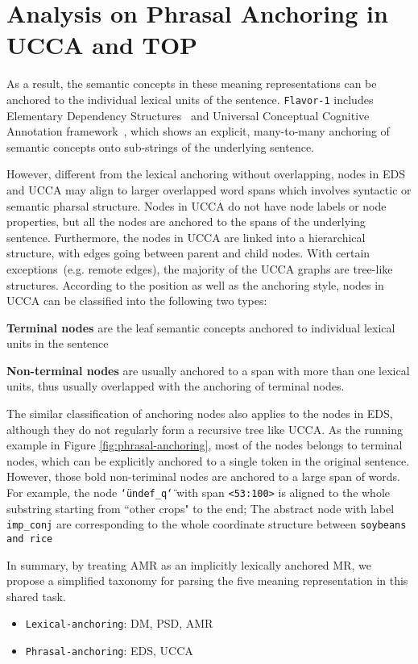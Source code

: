 \section{Analysis on Phrasal Anchoring in UCCA and TOP}
\label{sec:phr:anchor-analysis}

As a result, the semantic concepts in these meaning
representations can be anchored to the individual lexical units of the
sentence. \texttt{Flavor-1} includes Elementary Dependency
Structures~\cite[EDS,][]{oepen2006discriminant} and Universal
Conceptual Cognitive Annotation
framework~\cite[UCCA,][]{abend2013universal}, which shows an explicit,
many-to-many anchoring of semantic concepts onto sub-strings of the
underlying sentence.

However, different from the lexical anchoring without overlapping,
nodes in EDS and UCCA may align to larger overlapped word spans which
involves syntactic or semantic pharsal structure. Nodes in UCCA do not
have node labels or node properties, but all the nodes are anchored to
the spans of the underlying sentence. Furthermore, the nodes in UCCA
are linked into a hierarchical structure, with edges going between
parent and child nodes. With certain exceptions~(e.g. remote edges),
the majority of the UCCA graphs are tree-like structures. According to
the position as well as the anchoring style, nodes in UCCA can be
classified into the following two types:

\begin{inparaenum}
\item \textbf{Terminal nodes} are the leaf semantic
  concepts anchored to individual lexical units in the sentence

\item \textbf{Non-terminal nodes} are usually anchored to a span with
  more than one lexical units, thus usually overlapped with the
  anchoring of terminal nodes.
\end{inparaenum}

The similar classification of anchoring nodes also applies to the
nodes in EDS, although they do not regularly form a recursive tree
like UCCA. As the running example in Figure
\ref{fig:phrasal-anchoring}, most of the nodes belongs to terminal
nodes, which can be explicitly anchored to a single token in the
original sentence. However, those bold non-teriminal nodes are
anchored to a large span of words. For example, the node
\texttt{\char`\"undef\_q\char`\"} with span \texttt{<53:100>} is
aligned to the whole substring starting from ``other crops" to the
end; The abstract node with label \texttt{imp\_conj} are corresponding
to the whole coordinate structure between \texttt{soybeans and rice}

In summary, by treating AMR as an implicitly lexically anchored MR, we
propose a simplified taxonomy for parsing the five meaning
representation in this shared task.

\begin{itemize}
\item \texttt{Lexical-anchoring}: DM, PSD, AMR
\item \texttt{Phrasal-anchoring}: EDS, UCCA
\end{itemize}

